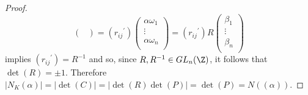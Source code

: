 \documentclass[10pt]{amsart}
\begin{document}
\begin{thm}
\begin{proof}
$$\begin{pmatrix}
  \end{pmatrix}
  =
  ({r_{ij}}^{\prime})
  \begin{pmatrix}
    \alpha\omega_1\\
    \vdots\\
    \alpha\omega_n\\
  \end{pmatrix}
  = 
  ({r_{ij}}^{\prime})
  R
  \begin{pmatrix}
    \beta_1\\
    \vdots\\
    \beta_n\\
  \end{pmatrix}
  $$
  implies $ ({r_{ij}}^{\prime}) = R^{-1}$ and so, since $R,R^{-1} \in GL_n(\Z)$, it follows that $\det(R) = \pm 1$.
  Therefore $|N_K(\alpha)| = |\det(C)| = |\det(R)\det(P)| = \det(P) = N((\alpha))$.
\end{proof}
\end{thm}
\end{document}
